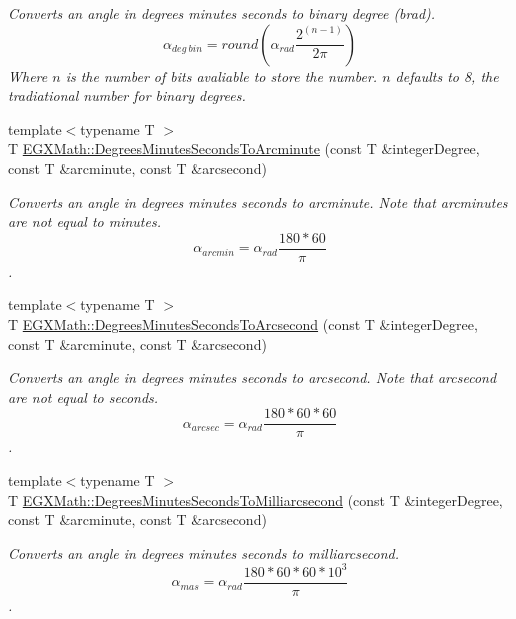 \begin{DoxyCompactItemize}
\begin{DoxyCompactList}\small\item\em Converts an angle in degrees minutes seconds to binary degree (brad). \[\alpha_{deg\ bin}=round(\alpha_{rad}\frac{2^{(n-1)}}{2 \pi})\] Where $n$ is the number of bits avaliable to store the number. $n$ defaults to 8, the tradiational number for binary degrees. \end{DoxyCompactList}\item 
{\footnotesize template$<$typename T $>$ }\\T \mbox{\hyperlink{group___e_g_x_math-_conversions-_angle_conversions-_degrees_minutes_seconds_gadb8da2c4b9cdd4f618b6281314b1318c}{E\+G\+X\+Math\+::\+Degrees\+Minutes\+Seconds\+To\+Arcminute}} (const T \&integer\+Degree, const T \&arcminute, const T \&arcsecond)
\begin{DoxyCompactList}\small\item\em Converts an angle in degrees minutes seconds to arcminute. Note that arcminutes are not equal to minutes. \[\alpha_{arcmin}=\alpha_{rad}\frac{180 * 60}{\pi}\]. \end{DoxyCompactList}\item 
{\footnotesize template$<$typename T $>$ }\\T \mbox{\hyperlink{group___e_g_x_math-_conversions-_angle_conversions-_degrees_minutes_seconds_gabebc8a012be0442c12409a2a71661ed4}{E\+G\+X\+Math\+::\+Degrees\+Minutes\+Seconds\+To\+Arcsecond}} (const T \&integer\+Degree, const T \&arcminute, const T \&arcsecond)
\begin{DoxyCompactList}\small\item\em Converts an angle in degrees minutes seconds to arcsecond. Note that arcsecond are not equal to seconds. \[\alpha_{arcsec}=\alpha_{rad}\frac{180 * 60 * 60}{\pi}\]. \end{DoxyCompactList}\item 
{\footnotesize template$<$typename T $>$ }\\T \mbox{\hyperlink{group___e_g_x_math-_conversions-_angle_conversions-_degrees_minutes_seconds_gafc5f994dfc7cc26500ca978336484926}{E\+G\+X\+Math\+::\+Degrees\+Minutes\+Seconds\+To\+Milliarcsecond}} (const T \&integer\+Degree, const T \&arcminute, const T \&arcsecond)
\begin{DoxyCompactList}\small\item\em Converts an angle in degrees minutes seconds to milliarcsecond. \[\alpha_{mas}=\alpha_{rad}\frac{180 * 60 * 60 * 10^3}{\pi}\]. \end{DoxyCompactList}\item 

\end{DoxyCompactItemize}
